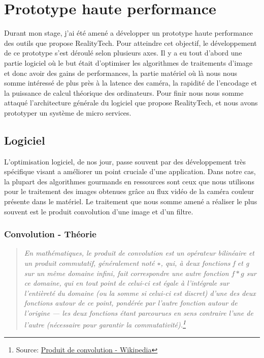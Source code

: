 \chapter{Prototype haute performance}
\label{chap:protoHP}

Durant mon stage, j'ai été amené a développer un prototype haute performance des outils que propose RealityTech. Pour atteindre cet objectif, le développement de ce prototype s'est déroulé selon plusieurs axes. Il y a eu tout d'abord une partie logiciel où le but était d'optimiser les algorithmes de traitements d'image et donc avoir des gains de performances, la partie matériel où là nous nous somme intéressé de plus près à la latence des caméra, la rapidité de l'encodage et la puissance de calcul théorique des ordinateurs. Pour finir nous nous somme attaqué l'architecture générale du logiciel que propose RealityTech, et nous avons prototyper un système de micro services.

\section{Logiciel}
L'optimisation logiciel, de nos jour, passe souvent par des développement très spécifique visant a améliorer un point cruciale d'une application. Dans notre cas, la plupart des algorithmes gourmands en ressources sont ceux que nous utilisons pour le traitement des images obtenues grâce au flux vidéo de la caméra couleur présente dans le matériel. Le traitement que nous somme amené a réaliser le plus souvent est le produit convolution d'une image et d'un filtre.

\subsection{Convolution - Théorie}
\begin{quotation}
\textit{En mathématiques, le produit de convolution est un opérateur bilinéaire et un produit commutatif, généralement noté $∗$, qui, à deux fonctions f et g sur un même domaine infini, fait correspondre une autre fonction $f * g$ sur ce domaine, qui en tout point de celui-ci est égale à l'intégrale sur l'entièreté du domaine (ou la somme si celui-ci est discret) d'une des deux fonctions autour de ce point, pondérée par l'autre fonction autour de l'origine — les deux fonctions étant parcourues en sens contraire l'une de l'autre (nécessaire pour garantir la commutativité).\footnote{Source: \href{https://fr.wikipedia.org/wiki/Produit_de_convolution}{Produit de convolution - Wikipedia}}}
\end{quotation}

